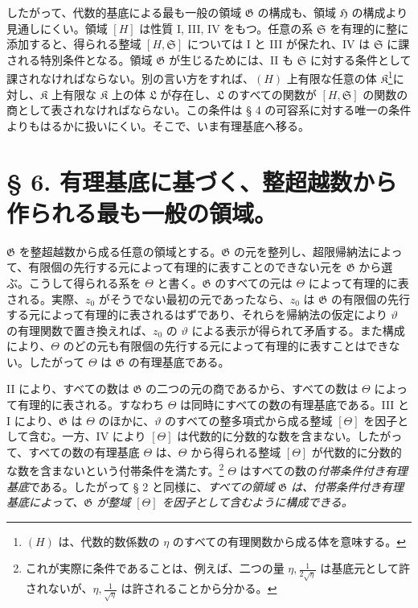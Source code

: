 \documentclass[11pt]{article}
\begin{document}
したがって、代数的基底による最も一般の領域 $\mathfrak G$ の構成も、領域 $\mathfrak H$ の構成より見通しにくい。領域 $[H]$ は性質 I, III, IV をもつ。任意の系 $\mathfrak S$ を有理的に整に添加すると、得られる整域 $[H,\mathfrak S]$ については I と III が保たれ、IV は $\mathfrak S$ に課される特別条件となる。領域 $\mathfrak G$ が生じるためには、II も $\mathfrak S$ に対する条件として課されなければならない。別の言い方をすれば、$(H)$ 上有限な任意の体 $\mathfrak K$\footnote{$(H)$ は、代数的数係数の $\eta$ のすべての有理関数から成る体を意味する。}に対し、$\mathfrak K$ 上有限な $\mathfrak K$ 上の体 $\mathfrak L$ が存在し、$\mathfrak L$ のすべての関数が $[H,\mathfrak S]$ の関数の商として表されなければならない。この条件は § 4 の可容系に対する唯一の条件よりもはるかに扱いにくい。そこで、いま有理基底へ移る。

\section*{§ 6. 有理基底に基づく、整超越数から作られる最も一般の領域。}

$\mathfrak G$ を整超越数から成る任意の領域とする。$\mathfrak G$ の元を整列し、超限帰納法によって、有限個の先行する元によって有理的に表すことのできない元を $\mathfrak G$ から選ぶ。こうして得られる系を $\Theta$ と書く。$\mathfrak G$ のすべての元は $\Theta$ によって有理的に表される。実際、$z_0$ がそうでない最初の元であったなら、$z_0$ は $\mathfrak G$ の有限個の先行する元によって有理的に表されるはずであり、それらを帰納法の仮定により $\vartheta$ の有理関数で置き換えれば、$z_0$ の $\vartheta$ による表示が得られて矛盾する。また構成により、$\Theta$ のどの元も有限個の先行する元によって有理的に表すことはできない。したがって $\Theta$ は $\mathfrak G$ の有理基底である。

II により、すべての数は $\mathfrak G$ の二つの元の商であるから、すべての数は $\Theta$ によって有理的に表される。すなわち $\Theta$ は同時にすべての数の有理基底である。III と I により、$\mathfrak G$ は $\Theta$ のほかに、$\vartheta$ のすべての整多項式から成る整域 $[\Theta]$ を因子として含む。一方、IV により $[\Theta]$ は代数的に分数的な数を含まない。したがって、すべての数の有理基底 $\Theta$ は、$\Theta$ から得られる整域 $[\Theta]$ が代数的に分数的な数を含まないという付帯条件を満たす。\footnote{これが実際に条件であることは、例えば、二つの量 $\eta,\frac1{2\sqrt{\eta}}$ は基底元として許されないが、$\eta,\frac1{\sqrt{\eta}}$ は許されることから分かる。} $\Theta$ はすべての数の\emph{付帯条件付き有理基底}である。したがって § 2 と同様に、\emph{すべての領域 $\mathfrak G$ は、付帯条件付き有理基底によって、$\mathfrak G$ が整域 $[\Theta]$ を因子として含むように構成できる。}
\end{document}
